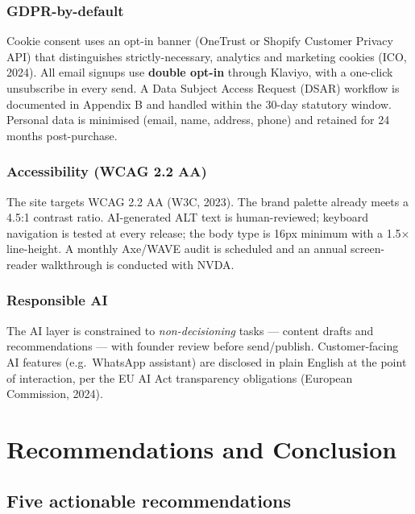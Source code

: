 \documentclass[
  11pt,
]{article}
\begin{document}
\subsubsection{GDPR-by-default}\label{gdpr-by-default}

Cookie consent uses an opt-in banner (OneTrust or Shopify Customer
Privacy API) that distinguishes strictly-necessary, analytics and
marketing cookies (ICO, 2024). All email signups use \textbf{double
opt-in} through Klaviyo, with a one-click unsubscribe in every send. A
Data Subject Access Request (DSAR) workflow is documented in Appendix B
and handled within the 30-day statutory window. Personal data is
minimised (email, name, address, phone) and retained for 24 months
post-purchase.

\subsubsection{Accessibility (WCAG 2.2
AA)}\label{accessibility-wcag-2.2-aa}

The site targets WCAG 2.2 AA (W3C, 2023). The brand palette already
meets a 4.5:1 contrast ratio. AI-generated ALT text is human-reviewed;
keyboard navigation is tested at every release; the body type is 16px
minimum with a 1.5× line-height. A monthly Axe/WAVE audit is scheduled
and an annual screen-reader walkthrough is conducted with NVDA.

\subsubsection{Responsible AI}\label{responsible-ai}

The AI layer is constrained to \emph{non-decisioning} tasks --- content
drafts and recommendations --- with founder review before send/publish.
Customer-facing AI features (e.g.~WhatsApp assistant) are disclosed in
plain English at the point of interaction, per the EU AI Act
transparency obligations (European Commission, 2024).

\newpage

\section{Recommendations and
Conclusion}\label{recommendations-and-conclusion}

\subsection{Five actionable
recommendations}\label{five-actionable-recommendations}
\end{document}
